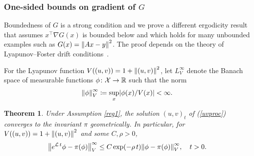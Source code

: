 \documentclass[11pt, twoside]{report}
\newtheorem{theorem}{Theorem}[section]
\begin{document}
\subsubsection{One-sided bounds on gradient of \texorpdfstring{$G$}{G}}
Boundedness of $G$ is a strong condition and we prove a different ergodicity result that assumes $x^\top \nabla G(x)$ is bounded below and which holds for many unbounded examples such as $G(x)=\left\lVert Ax-y\right\rVert^2$.
The proof depends on the theory of Lyapunov--Foster drift conditions~\cite{meyn2012-oq,Hairer2011-of,Lelievre2016-hx}. 

For the Lyapunov function $V((u,v))=1+\left\lVert(u,v)\right\rVert^2$, let $L^\infty_V$ denote the Banach space  of  measurable functions $\phi\colon \mathcal X\to\mathbb{R}$ such that the norm $$\norm{\phi}^\infty_
V\coloneq\sup_x \abs{\phi(x)/V(x)}<\infty.$$
\begin{theorem} \label{erg2} Under Assumption \ref{reg1}, the solution $(u,v)_t$ of (\ref{uvproc}) converges to the invariant $\pi$ geometrically. In particular, for $V((u,v))=1+\left\lVert(u,v)\right\rVert^2$ and some $C,\rho>0$,
    \[\norm{e^{\mathcal L\, t}\phi   - \pi(\phi)}^\infty_V\le  C \exp(-\rho\, t) \norm{\phi-\pi(\phi)}^\infty_V,\quad t>0.
    \]
\end{theorem}
%
\end{document}
